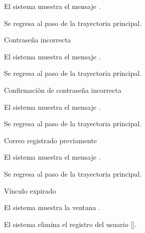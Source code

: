 {\begin{trayectoriaAlternativa}
    \item El sistema muestra el mensaje .

    \item Se regresa al paso  de la trayectoria
      principal.

  \end{trayectoriaAlternativa}

  \begin{trayectoriaAlternativa}
    {Contraseña incorrecta}

    \item El sistema muestra el mensaje
      .

    \item Se regresa al paso  de la trayectoria
      principal.

  \end{trayectoriaAlternativa}

  \begin{trayectoriaAlternativa}
    {Confirmación de contraseña incorrecta}

    \item El sistema muestra el mensaje
      .

    \item Se regresa al paso  de la trayectoria
      principal.

  \end{trayectoriaAlternativa}

  \begin{trayectoriaAlternativa}
    {Correo registrado previamente}

    \item El sistema muestra el mensaje
      .

    \item Se regresa al paso  de la trayectoria
      principal.

  \end{trayectoriaAlternativa}

  \begin{trayectoriaAlternativa}
    {Vínculo expirado}

    \item El sistema muestra la ventana
      .

    \item El sistema elimina el registro del usuario
      [].

  \end{trayectoriaAlternativa}
}
